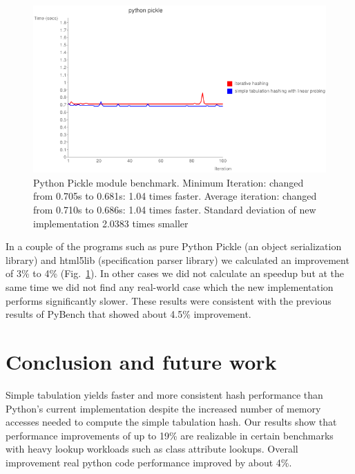 \documentclass[runningheads,a4paper]{llncs}
\begin{document}
\begin{figure}[!ht]
  \centering
  \includegraphics[width=12cm]{slowpickle.png}
  \caption{Python Pickle module benchmark. Minimum Iteration: changed from 0.705s to 0.681s: 1.04 times faster. Average iteration: changed from 0.710s to 0.686s: 1.04 times faster. Standard deviation of new implementation 2.0383 times smaller}
  \label{fig:pickle}
\end{figure}


In a couple of the programs such as pure Python Pickle (an object serialization
library) and html5lib (specification parser library) we calculated an
improvement of 3\% to 4\% (Fig.~\ref{fig:pickle}). In other cases we did not calculate an speedup but
at the same time we did not find any real-world case which the new
implementation performs significantly slower. These results were consistent
with the previous results of PyBench that showed about 4.5\% improvement.
 
\section{Conclusion and future work}


Simple tabulation yields faster and more consistent hash performance than Python's current implementation  despite the increased number of memory accesses needed to compute the simple tabulation hash.  Our results show that performance improvements of up to 19\% are realizable in certain benchmarks with heavy lookup workloads such as class attribute lookups.  Overall improvement real python code performance improved by about 4\%.
\end{document}
